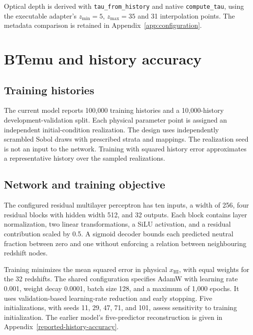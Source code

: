 Optical depth is derived with \texttt{tau\_from\_history} and native \texttt{compute\_tau}, using the executable adapter's $z_{\min}=5$, $z_{\max}=35$ and 31 interpolation points. The metadata comparison is retained in Appendix~\ref{app:configuration}.

\section{BTemu and history accuracy}\label{btemu-a-surrogate-for-neutral-fraction-histories}

\subsection{Training histories}\label{training-data-and-initial-conditions}

The current model reports 100,000 training histories and a 10,000-history development-validation split. Each physical parameter point is assigned an independent initial-condition realization. The design uses independently scrambled Sobol draws with prescribed strata and mappings. The realization seed is not an input to the network. Training with squared history error approximates a representative history over the sampled realizations.

\subsection{Network and training objective}\label{network-and-training-objective}

The configured residual multilayer perceptron has ten inputs, a width of 256, four residual blocks with hidden width 512, and 32 outputs. Each block contains layer normalization, two linear transformations, a SiLU activation, and a residual contribution scaled by 0.5. A sigmoid decoder bounds each predicted neutral fraction between zero and one without enforcing a relation between neighbouring redshift nodes.

Training minimizes the mean squared error in physical \ensuremath{x_{\mathrm{HI}}}, with equal weights for the 32 redshifts. The shared configuration specifies AdamW with learning rate 0.001, weight decay 0.0001, batch size 128, and a maximum of 1,000 epochs. It uses validation-based learning-rate reduction and early stopping. Five initializations, with seeds 11, 29, 47, 71, and 101, assess sensitivity to training initialization. The earlier model's five-predictor reconstruction is given in Appendix~\ref{reported-history-accuracy}.


